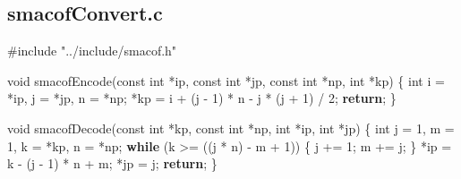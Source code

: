 \documentclass[
  12pt,
  letterpaper,
  DIV=11,
  numbers=noendperiod]{scrreprt}
\newenvironment{Shaded}{\begin{snugshade}}{\end{snugshade}}
\newcommand{\ControlFlowTok}[1]{\textcolor[rgb]{0.00,0.23,0.31}{\textbf{#1}}}
\newcommand{\DataTypeTok}[1]{\textcolor[rgb]{0.68,0.00,0.00}{#1}}
\newcommand{\DecValTok}[1]{\textcolor[rgb]{0.68,0.00,0.00}{#1}}
\newcommand{\ImportTok}[1]{\textcolor[rgb]{0.00,0.46,0.62}{#1}}
\newcommand{\NormalTok}[1]{\textcolor[rgb]{0.00,0.23,0.31}{#1}}
\newcommand{\OperatorTok}[1]{\textcolor[rgb]{0.37,0.37,0.37}{#1}}
\newcommand{\PreprocessorTok}[1]{\textcolor[rgb]{0.68,0.00,0.00}{#1}}
\theoremstyle{remark}
\begin{document}
\subsection*{smacofConvert.c}\label{smacofconvert.c}

\begin{Shaded}
\begin{Highlighting}[]
\PreprocessorTok{\#include }\ImportTok{"../include/smacof.h"}

\DataTypeTok{void}\NormalTok{ smacofEncode}\OperatorTok{(}\DataTypeTok{const} \DataTypeTok{int} \OperatorTok{*}\NormalTok{ip}\OperatorTok{,} \DataTypeTok{const} \DataTypeTok{int} \OperatorTok{*}\NormalTok{jp}\OperatorTok{,} \DataTypeTok{const} \DataTypeTok{int} \OperatorTok{*}\NormalTok{np}\OperatorTok{,} \DataTypeTok{int} \OperatorTok{*}\NormalTok{kp}\OperatorTok{)} \OperatorTok{\{}
    \DataTypeTok{int}\NormalTok{ i }\OperatorTok{=} \OperatorTok{*}\NormalTok{ip}\OperatorTok{,}\NormalTok{ j }\OperatorTok{=} \OperatorTok{*}\NormalTok{jp}\OperatorTok{,}\NormalTok{ n }\OperatorTok{=} \OperatorTok{*}\NormalTok{np}\OperatorTok{;}
    \OperatorTok{*}\NormalTok{kp }\OperatorTok{=}\NormalTok{ i }\OperatorTok{+} \OperatorTok{(}\NormalTok{j }\OperatorTok{{-}} \DecValTok{1}\OperatorTok{)} \OperatorTok{*}\NormalTok{ n }\OperatorTok{{-}}\NormalTok{ j }\OperatorTok{*} \OperatorTok{(}\NormalTok{j }\OperatorTok{+} \DecValTok{1}\OperatorTok{)} \OperatorTok{/} \DecValTok{2}\OperatorTok{;}
    \ControlFlowTok{return}\OperatorTok{;}
\OperatorTok{\}}

\DataTypeTok{void}\NormalTok{ smacofDecode}\OperatorTok{(}\DataTypeTok{const} \DataTypeTok{int} \OperatorTok{*}\NormalTok{kp}\OperatorTok{,} \DataTypeTok{const} \DataTypeTok{int} \OperatorTok{*}\NormalTok{np}\OperatorTok{,} \DataTypeTok{int} \OperatorTok{*}\NormalTok{ip}\OperatorTok{,} \DataTypeTok{int} \OperatorTok{*}\NormalTok{jp}\OperatorTok{)} \OperatorTok{\{}
    \DataTypeTok{int}\NormalTok{ j }\OperatorTok{=} \DecValTok{1}\OperatorTok{,}\NormalTok{ m }\OperatorTok{=} \DecValTok{1}\OperatorTok{,}\NormalTok{ k }\OperatorTok{=} \OperatorTok{*}\NormalTok{kp}\OperatorTok{,}\NormalTok{ n }\OperatorTok{=} \OperatorTok{*}\NormalTok{np}\OperatorTok{;}
    \ControlFlowTok{while} \OperatorTok{(}\NormalTok{k }\OperatorTok{\textgreater{}=} \OperatorTok{((}\NormalTok{j }\OperatorTok{*}\NormalTok{ n}\OperatorTok{)} \OperatorTok{{-}}\NormalTok{ m }\OperatorTok{+} \DecValTok{1}\OperatorTok{))} \OperatorTok{\{}
\NormalTok{        j }\OperatorTok{+=} \DecValTok{1}\OperatorTok{;}
\NormalTok{        m }\OperatorTok{+=}\NormalTok{ j}\OperatorTok{;}
    \OperatorTok{\}}
    \OperatorTok{*}\NormalTok{ip }\OperatorTok{=}\NormalTok{ k }\OperatorTok{{-}} \OperatorTok{(}\NormalTok{j }\OperatorTok{{-}} \DecValTok{1}\OperatorTok{)} \OperatorTok{*}\NormalTok{ n }\OperatorTok{+}\NormalTok{ m}\OperatorTok{;}
    \OperatorTok{*}\NormalTok{jp }\OperatorTok{=}\NormalTok{ j}\OperatorTok{;}
    \ControlFlowTok{return}\OperatorTok{;}
\OperatorTok{\}}









\end{Highlighting}
\end{Shaded}
\end{document}
